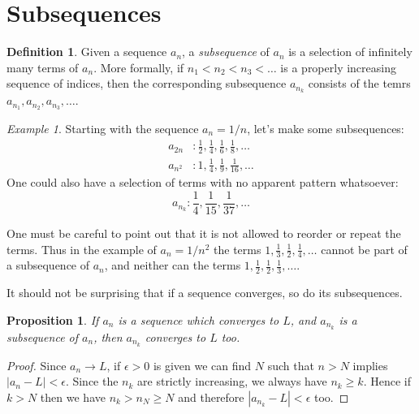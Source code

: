 \documentclass[11pt,oneside]{amsbook}
\theoremstyle{definition}
\theoremstyle{plain}
\newtheorem{cor}[thm]{Corollary}
\newtheorem{prop}[thm]{Proposition}
\theoremstyle{definition}
\newtheorem{defn}[thm]{Definition}
\theoremstyle{remark}
\newtheorem{example}[thm]{Example}
\numberwithin{equation}{section}
\numberwithin{figure}{section}
\begin{document}

\newpage
\section{Subsequences}

\begin{defn}
  Given a sequence $a_n$, a \emph{subsequence} of $a_n$ is a selection of infinitely many terms of $a_n$. More formally, if $n_1<n_2<n_3<\ldots$ is a properly increasing sequence of indices, then the corresponding subsequence $a_{n_k}$ consists of the temrs $a_{n_1},a_{n_2},a_{n_3},\ldots$.
\end{defn}

\begin{example}
  Starting with the sequence $a_n=1/n$, let's make some subsequences:
  \begin{align*}
    a_{2n}&: \frac12, \frac14, \frac16, \frac18, \ldots\\
    a_{n^2}&: 1, \frac14, \frac19, \frac1{16}, \ldots
  \end{align*}
  One could also have a selection of terms with no apparent pattern whatsoever:
  \[a_{n_k}:\frac14, \frac{1}{15}, \frac{1}{37},\ldots
  \]
\end{example}

One must be careful to point out that it is not allowed to reorder or repeat the terms. Thus in the example of $a_n=1/n^2$ the terms $1,\frac13,\frac12,\frac14,\ldots$ cannot be part of a subsequence of $a_n$, and neither can the terms $1,\frac12,\frac12,\frac13,\ldots$.

It should not be surprising that if a sequence converges, so do its subsequences.

\begin{prop}
  \label{prop:subsequence}
  If $a_n$ is a sequence which converges to $L$, and $a_{n_k}$ is a subsequence of $a_n$, then $a_{n_k}$ converges to $L$ too.
\end{prop}

\begin{proof}
  Since $a_n\to L$, if $\epsilon>0$ is given we can find $N$ such that $n>N$ implies $|a_n-L|<\epsilon$. Since the $n_k$ are strictly increasing, we always have $n_k\geq k$. Hence if $k>N$ then we have $n_k>n_N\geq N$ and therefore $|a_{n_k}-L|<\epsilon$ too.
\end{proof}
\end{document}
